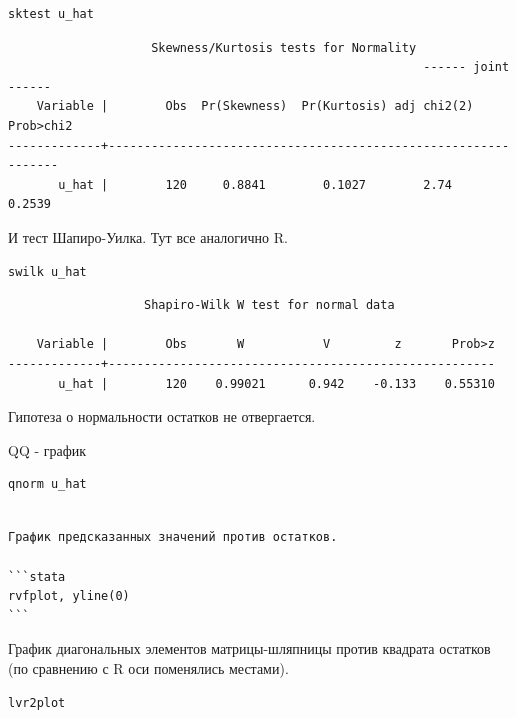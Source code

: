 \documentclass[]{book}
\begin{document}
\begin{verbatim}
sktest u_hat
\end{verbatim}

\begin{verbatim}
                    Skewness/Kurtosis tests for Normality
                                                          ------ joint ------
    Variable |        Obs  Pr(Skewness)  Pr(Kurtosis) adj chi2(2)   Prob>chi2
-------------+---------------------------------------------------------------
       u_hat |        120     0.8841        0.1027        2.74         0.2539
\end{verbatim}

И тест Шапиро-Уилка. Тут все аналогично R.

\begin{verbatim}
swilk u_hat
\end{verbatim}

\begin{verbatim}
                   Shapiro-Wilk W test for normal data

    Variable |        Obs       W           V         z       Prob>z
-------------+------------------------------------------------------
       u_hat |        120    0.99021      0.942    -0.133    0.55310
\end{verbatim}

Гипотеза о нормальности остатков не отвергается.

QQ - график

\begin{verbatim}
qnorm u_hat 
\end{verbatim}

\begin{verbatim}

График предсказанных значений против остатков.

```stata
rvfplot, yline(0)
```
\end{verbatim}

График диагональных элементов матрицы-шляпницы против квадрата остатков (по сравнению с R оси поменялись местами).

\begin{verbatim}
lvr2plot
\end{verbatim}
\end{document}
